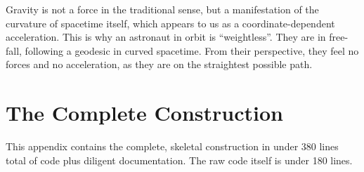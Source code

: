 \documentclass[twocolumn]{article}
\begin{document}
Gravity is not a force in the traditional sense, but a manifestation of
the curvature of spacetime itself, which appears to us as a
coordinate-dependent acceleration. This is why an astronaut in orbit is
``weightless''. They are in free-fall, following a geodesic in curved
spacetime. From their perspective, they feel no forces and no
acceleration, as they are on the straightest possible path.

\onecolumn

\section{The Complete Construction}\label{app:FullCode}

This appendix contains the complete, skeletal construction in under
380 lines total of code plus diligent documentation. The raw code
itself is under 180 lines.



\twocolumn
\end{document}
